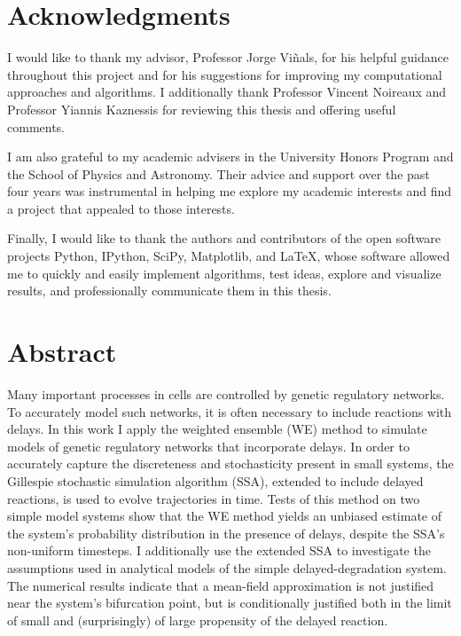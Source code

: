 \documentclass[english,letterpaper,12pt]{report}
\begin{document}
\begin{doublespacing}

\chapter*{Acknowledgments} %
\label{sec:acknowledgements}

I would like to thank my advisor, Professor Jorge Viñals, for his helpful guidance throughout this project and for his suggestions for improving my computational approaches and algorithms. I additionally thank Professor Vincent Noireaux and Professor Yiannis Kaznessis for reviewing this thesis and offering useful comments.

I am also grateful to my academic advisers in the University Honors Program and the School of Physics and Astronomy. Their advice and support over the past four years was instrumental in helping me explore my academic interests and find a project that appealed to those interests. 

Finally, I would like to thank the authors and contributors of the open software projects Python, IPython, SciPy, Matplotlib, and \LaTeX, whose software allowed me to quickly and easily implement algorithms, test ideas, explore and visualize results, and professionally communicate them in this thesis.

\chapter*{Abstract}
Many important processes in cells are controlled by genetic regulatory networks. To accurately model such networks, it is often necessary to include reactions with delays. In this work I apply the weighted ensemble (WE) method to simulate models of genetic regulatory networks that incorporate delays. In order to accurately capture the discreteness and stochasticity present in small systems, the Gillespie stochastic simulation algorithm (SSA), extended to include delayed reactions, is used to evolve trajectories in time. Tests of this method on two simple model systems show that the WE method yields an unbiased estimate of the system's probability distribution in the presence of delays, despite the SSA's non-uniform timesteps. I additionally use the extended SSA to investigate the assumptions used in analytical models of the simple delayed-degradation system. The numerical results indicate that a mean-field approximation is not justified near the system's bifurcation point, but is conditionally justified both in the limit of small and (surprisingly) of large propensity of the delayed reaction.


\end{doublespacing}
\end{document}
